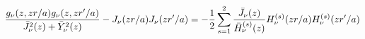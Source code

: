 \begin{equation}
\frac{g_{\nu }(z,zr/a)g_{\nu }(z,zr^{\prime }/a)}{\bar{J}_{\nu }^{2}(z)+\bar{%
Y}_{\nu }^{2}(z)}-J_{\nu }(zr/a)J_{\nu }(zr^{\prime }/a)=-\frac{1}{2}%
\sum_{s=1}^{2}\frac{\bar{J}_{\nu }(z)}{\bar{H}_{\nu }^{(s)}(z)}%
H_{\nu }^{(s)}(zr/a)H_{\nu }^{(s)}(zr^{\prime }/a) \label{relab}
\end{equation}

